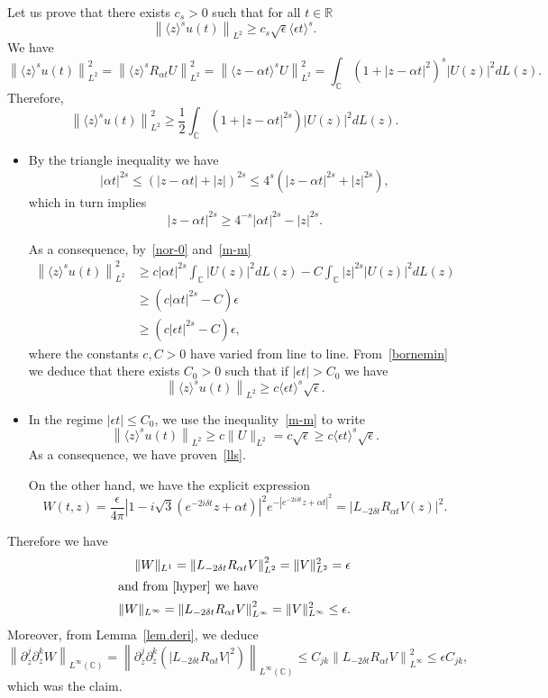 \documentclass[10pt]{amsart}
\theoremstyle{definition}\newtheorem{defi}[theo]{Definition}\newtheorem{rema}[theo]{Remark}\newtheorem{exam}[theo]{Example}\newtheorem{exem}[theo]{Example}\newtheorem{nota}[theo]{Notation}
\newcommand{\C}{\mathbb{C}}
\newcommand{\R}{\mathbb{R}}
\newcommand*\eps{\epsilon}
\newcommand{\ov}{\overline}
\newcommand{\<}{\langle}
\renewcommand{\>}{\rangle}
\begin{document}
Let us prove that there exists $c_s>0$ such that for all $t \in \R$
\begin{equation}\label{lls}
\left\|\<z\>^s u(t)\right\|_{L^2} \geq c_s \sqrt{\eps} \<\eps t\>^s.
\end{equation}
We have
\[
\left\|\<z\>^s u(t)\right\|^2_{L^2}= \left\|\<z\>^s R_{\alpha t}U\right\|^2_{L^2} = \left\|\<z-\alpha t\>^s U\right\|^2_{L^2}= \int_{\C} \left(1+|z-\alpha t|^2\right)^s |U(z)|^2dL(z).
\]
Therefore,
\begin{equation}\label{m-m}
\left\|\<z\>^s u(t)\right\|^2_{L^2} \geq \frac12 \int_{\C} \left(1+|z-\alpha t|^{2s}\right) |U(z)|^2dL(z).
\end{equation}
\begin{itemize}
\item By the triangle inequality we have
\[
|\alpha t|^{2s} \leq \left(|z- \alpha t|+|z|\right)^{2s} \leq 4^s\left(|z- \alpha t|^{2s}+ |z|^{2s}\right),
\]
which in turn implies
\[
|z- \alpha t|^{2s} \geq 4^{-s}|\alpha t|^{2s} -|z|^{2s}.
\]

As a consequence, by~\eqref{nor-0} and~\eqref{m-m}
\begin{equation}\label{bornemin}
\begin{aligned}
\left\|\<z\>^s u(t)\right\|^2_{L^2} &\geq c |\alpha t|^{2s} \int_{\C} \left|U(z)\right|^2dL(z)- C \int_{\C} |z|^{2s} \left|U(z)\right|^2dL(z) \\
&\geq \left(c |\alpha t|^{2s} - C\right) \eps \\
&\geq \left(c |\eps t|^{2s} - C\right) \eps,
\end{aligned}
\end{equation}
where the constants $c,C>0$ have varied from line to line. From~\eqref{bornemin} we deduce that there exists $C_0>0$ such that if $|\eps t|>C_0$ we have
\[
\left\|\<z\>^s u(t)\right\|_{L^2} \geq c\<\eps t\>^s \sqrt{\eps}.
\]
\item In the regime $|\eps t|\leq C_0$, we use the inequality~\eqref{m-m} to write
\[
\left\|\<z\>^s u(t)\right\|_{L^2} \geq c \| U\|_{L^2}=c \sqrt{\eps} \geq c\<\eps t\>^s \sqrt{\eps}.
\]
As a consequence, we have proven~\eqref{lls}.

On the other hand, we have the explicit expression
\[
W(t,z)=\frac{\eps}{4\pi}\left| 1-i\sqrt{3}\left(e^{-2i\delta t}z+\alpha t\right) \right|^2e^{-\left|e^{-2i\delta t}z+\alpha t\right|^2}= \left|L_{-2\delta t}R_{\alpha t}V(z)\right|^2.
\]
\end{itemize}
Therefore we have
\begin{align*}
\|W\|_{L^1}= \left\| L_{-2\delta t}R_{\alpha t}V\right\|^2_{L^2}= \| V\|^2_{L^2} =\eps
\\
\intertext{and from~\eqref{hyper} we have}
\|W\|_{L^\infty}= \left\| L_{-2\delta t}R_{\alpha t}V\right\|^2_{L^\infty}= \| V\|^2_{L^\infty} \leq \eps.
\end{align*}
Moreover, from Lemma~\ref{lem.deri}, we deduce
\[
\left\|\partial^j_{\ov z } \partial^k_z W \right\|_{L^{\infty}(\C)}= \left\|\partial^j_{\ov z } \partial^k_z \left(\left|L_{-2\delta t}R_{\alpha t}V\right|^2\right) \right\|_{L^{\infty}(\C)} \leq C_{jk} \left\| L_{-2\delta t}R_{\alpha t}V\right\|^2_{L^\infty} \leq \eps C_{jk},
\]
which was the claim.
\end{document}
